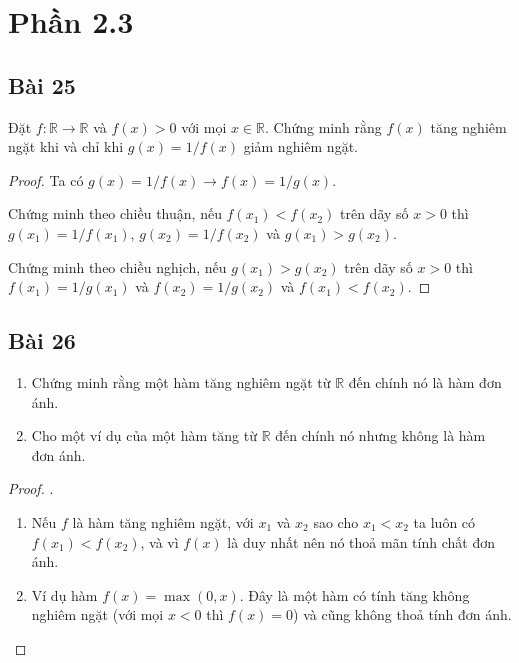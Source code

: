 \section*{Phần 2.3}
\subsection*{Bài 25}
Đặt $f:\mathbb{R}\rightarrow\mathbb{R}$ và $f(x)>0$ với mọi $x\in\mathbb{R}$. Chứng minh rằng $f(x)$ tăng nghiêm ngặt khi và chỉ khi $g(x)=1/f(x)$ giảm nghiêm ngặt.
\begin{proof}
    Ta có $g(x)=1/f(x)\rightarrow f(x)=1/g(x)$.
    \par Chứng minh theo chiều thuận, nếu $f(x_1)<f(x_2)$ trên dãy số $x>0$ thì $g(x_1)=1/f(x_1)$, $g(x_2)=1/f(x_2)$ và $g(x_1)>g(x_2)$.
    \par Chứng minh theo chiều nghịch, nếu $g(x_1)>g(x_2)$ trên dãy số $x>0$ thì $f(x_1)=1/g(x_1)$ và $f(x_2)=1/g(x_2)$ và $f(x_1)<f(x_2)$.
\end{proof}
\subsection*{Bài 26}
\begin{enumerate}[label=\alph*)]
    \item Chứng minh rằng một hàm tăng nghiêm ngặt từ $\mathbb{R}$ đến chính nó là hàm đơn ánh.
    \item Cho một ví dụ của một hàm tăng từ $\mathbb{R}$ đến chính nó nhưng không là hàm đơn ánh.
\end{enumerate}
\begin{proof}.
    \begin{enumerate}[label=\alph*)]
        \item Nếu $f$ là hàm tăng nghiêm ngặt, với $x_1$ và $x_2$ sao cho $x_1<x_2$ ta luôn có $f(x_1)<f(x_2)$, và vì $f(x)$ là duy nhất nên nó thoả mãn tính chất đơn ánh.
        \item Ví dụ hàm $f(x)=\max(0,x)$. Đây là một hàm có tính tăng không nghiêm ngặt (với mọi $x<0$ thì $f(x)=0$) và cũng không thoả tính đơn ánh.
    \end{enumerate}
\end{proof}
